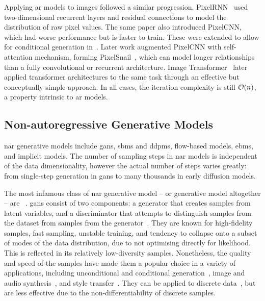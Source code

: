 Applying \gls{ar} models to images followed a similar progression.
PixelRNN~\cite{oord2016pixelrnn} used two-dimensional recurrent layers and
residual connections to model the distribution of raw pixel values. The same
paper also introduced PixelCNN, which had worse performance but is faster to
train. These were extended to allow for conditional generation
in~\cite{oord2016pixelcnn}. Later work augmented PixelCNN with self-attention
mechanism, forming PixelSnail~\cite{chen2017snail}, which can model longer
relationships than a fully convolutional or recurrent architecture. Image
Transformer~\cite{parmar2018image} later applied transformer architectures to
the same task through an effective but conceptually simple approach. In all
cases, the iteration complexity is still $\mathcal{O}(n)$, a property intrinsic to
\gls{ar} models.

\subsection{Non-autoregressive Generative Models}
\label{subsec:nagm}

\Acrfull{nar} generative models include \glspl{gan}, \glspl{sbm} and
\glspl{ddpm}, flow-based models, \glspl{ebm}, and implicit models. The number of
sampling steps in \gls{nar} models is independent of the data dimensionality,
however the actual number of steps varies greatly: from single-step generation
in \glspl{gan} to many thousands in early diffusion models.

The most infamous class of \gls{nar} generative model -- or generative model
altogether -- are ~\cite{goodfellow2014gan}. \Glspl{gan} consist
of two components: a generator that creates samples from latent variables, and a
discriminator that attempts to distinguish samples from the dataset from samples
from the generator~\cite{goodfellow2014gan}. They are known for high-fidelity
samples, fast sampling, unstable training, and tendency to collapse onto a
subset of modes of the data distribution, due to not optimising directly for
likelihood. This is reflected in its relatively low-diversity samples.
Nonetheless, the quality and speed of the samples have made them a popular
choice in a variety of applications, including unconditional and conditional
generation~\cite{tero2018stylegan,andrew2018biggan}, image and audio
synthesis~\cite{liu2020audiogan}, and style transfer~\cite{zhu2017cyclegan}.
They can be applied to discrete data~\cite{autume2019scratchgan}, but are
less effective due to the non-differentiability of discrete samples.

